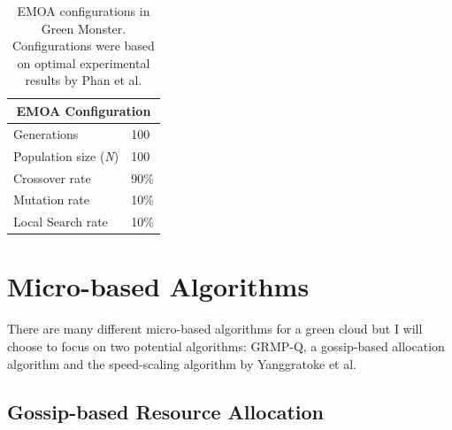 \documentclass{sig-alternate}
\begin{document}
\begin{table}[tb]
\begin{center}
\begin{tabular}{|l|l|}
    \hline
    \multicolumn{2}{|c|}{\textbf{EMOA Configuration}} \\
    \hline
    Generations & 100 \\
    Population size (\emph{N}) & 100 \\
    Crossover rate & 90\% \\
    Mutation rate & 10\% \\
    Local Search rate & 10\% \\
    \hline
\end{tabular}
\caption{EMOA configurations in Green Monster. Configurations were based on optimal experimental results by Phan et al.}
\label{tab:EMOAConfig}
\end{center}
\end{table}



\section{Micro-based Algorithms} 
\label{sec:MicAl}

There are many different micro-based algorithms for a green cloud but I will choose to focus on two potential algorithms: GRMP-Q, a gossip-based allocation algorithm and the speed-scaling algorithm by Yanggratoke et al. 
\subsection{Gossip-based Resource Allocation}
\label{sec:GBRA}

\end{document}

